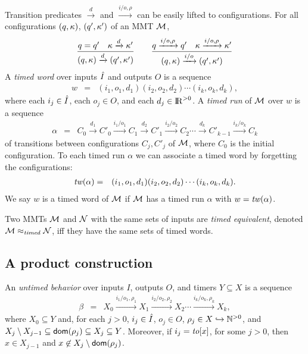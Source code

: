 Transition predicates $\xrightarrow{d}$ and $\xrightarrow{i/o, \rho}$ can be easily lifted to configurations.
For all configurations $(q, \kappa)$, $(q', \kappa')$ of an MMT ${\cal M}$,
\[
\frac{q = q' \quad \kappa \xrightarrow{d} \kappa'}{(q,\kappa) \xrightarrow{d} (q',\kappa')}
\quad\quad
  \frac{q \xrightarrow{i/o,\rho} q' \quad \kappa \xrightarrow{i/o, \rho} \kappa'}{(q,\kappa) \xrightarrow{i/o} (q',\kappa')}
\]
A \emph{timed word} over inputs $\hat{I}$ and outputs $O$ is a sequence
\begin{eqnarray*}
w & = &  (i_1, o_1, d_1) (i_2, o_2, d_2) \cdots (i_k, o_k, d_k),
\end{eqnarray*}
where each $i_j \in \hat{I}$, each $o_j \in O$, and each $d_j \in {\rm I\!R}^{> 0}$.
A \emph{timed run} of ${\cal M}$ over $w$ is a sequence 
\begin{eqnarray*}
\alpha & = & C_0 \xrightarrow{d_1} C'_0 \xrightarrow{i_1/o_1} C_1 \xrightarrow{d_2} C'_1 \xrightarrow{i_2/o_2} C_2 \cdots
\xrightarrow{d_k} C'_{k-1} \xrightarrow{i_k/o_k} C_{k}
\end{eqnarray*}
of transitions between configurations $C_j, C'_j$ of ${\cal M}$, where $C_0$ is the initial configuration.
To each timed run $\alpha$ we can associate a timed word by forgetting the configurations:
\begin{eqnarray*}
\mathit{tw}(\alpha) & = & (i_1, o_1, d_1) (i_2, o_2, d_2) \cdots (i_k, o_k, d_k).
\end{eqnarray*}
We say $w$ is a timed word of ${\cal M}$ if ${\cal M}$ has a timed run $\alpha$ with $w = \mathit{tw}(\alpha)$.

Two MMTs ${\cal M}$ and ${\cal N}$ with the same sets of inputs are \emph{timed equivalent}, denoted ${\cal M} \approx_{\mathit{timed}} {\cal N}$, iff 
they have the same sets of timed words.


\subsection{A product construction}
An \emph{untimed behavior} over inputs $I$, outputs $O$, and timers $Y \subseteq X$ is a sequence 
\begin{eqnarray*}
\beta & = & X_0 \xrightarrow{i_1/o_1, \rho_1} X_1  \xrightarrow{i_2/o_2, \rho_2} X_2 \cdots \xrightarrow{i_k/o_k, \rho_k} X_{k},
\end{eqnarray*}
where $X_0 \subseteq Y$ and, for each $j>0$,  $i_j \in \hat{I}$, $o_j \in O$, $\rho_j \in X \hookrightarrow {\mathbb N}^{>0}$, and
 $X_j \setminus X_{j-1}  \subseteq {\textsf{dom}}(\rho_j) \subseteq X_j \subseteq Y$.
Moreover, if $i_j = \mathit{to}[x]$, for some $j>0$, then $x \in X_{j-1}$ and $x \not\in X_j \setminus {\textsf{dom}}(\rho_j)$.

